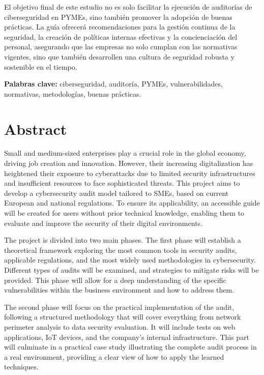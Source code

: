 \documentclass[a4paper, 10pt]{article}
\begin{document}
El objetivo final de este estudio no es solo facilitar la ejecución de auditorías de ciberseguridad en PYMEs, sino también promover la adopción de buenas prácticas. La guía ofrecerá recomendaciones para la gestión continua de la seguridad, la creación de políticas internas efectivas y la concienciación del personal, asegurando que las empresas no solo cumplan con las normativas vigentes, sino que también desarrollen una cultura de seguridad robusta y sostenible en el tiempo.

\par\vspace{0.5cm}
\textbf{Palabras clave:} ciberseguridad, auditoría, PYMEs, vulnerabilidades, normativas, metodologías, buenas prácticas.
\clearpage


\section*{Abstract}
\thispagestyle{empty}

Small and medium-sized enterprises play a crucial role in the global economy, driving job creation and innovation. However, their increasing digitalization has heightened their exposure to cyberattacks due to limited security infrastructures and insufficient resources to face sophisticated threats. This project aims to develop a cybersecurity audit model tailored to SMEs, based on current European and national regulations. To ensure its applicability, an accessible guide will be created for users without prior technical knowledge, enabling them to evaluate and improve the security of their digital environments.
\par\vspace{0.5cm}

The project is divided into two main phases. The first phase will establish a theoretical framework exploring the most common tools in security audits, applicable regulations, and the most widely used methodologies in cybersecurity. Different types of audits will be examined, and strategies to mitigate risks will be provided. This phase will allow for a deep understanding of the specific vulnerabilities within the business environment and how to address them.
\par\vspace{0.5cm}

The second phase will focus on the practical implementation of the audit, following a structured methodology that will cover everything from network perimeter analysis to data security evaluation. It will include tests on web applications, IoT devices, and the company’s internal infrastructure. This part will culminate in a practical case study illustrating the complete audit process in a real environment, providing a clear view of how to apply the learned techniques.
\par\vspace{0.5cm}
\end{document}
